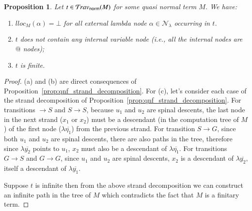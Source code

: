 \documentclass{elsarticle}
\makeatletter
\theoremstyle{plain}
\newtheorem{proposition}[theorem]{Proposition}
\theoremstyle{definition}
\theoremstyle{remark}
\newcommand\Nodes{\mathcal{N}}%
\newcommand\NodesLmd{\Nodes_\lambda}%
\newcommand{\normalizing}{{\sf norm}}
\newcommand{\travsetnorm}{\travset_\normalizing}
\renewcommand\ie{{\it i.e.\@\xspace}}
\makeatother
\begin{document}
\begin{proposition}
\label{prop:qnf_traversals_are_finite}
Let $t \in \travsetnorm(M)$ for some \emph{quasi normal} term $M$. We have:
\begin{enumerate}[label=(\alph*), nosep]
\item $lloc_M(\alpha) = \bot$ for all external lambda node $\alpha \in \NodesLmd$ occurring in $t$.
\item $t$ does not contain any internal variable node (\ie, all the internal nodes are $@$ nodes);
\item $t$ is finite.
\end{enumerate}
\end{proposition}
\begin{proof}
(a) and (b) are direct consequences of Proposition~\ref{prop:qnf_strand_decomposition}.
For (c), let's consider each case of the strand decomposition of Proposition~\ref{prop:qnf_strand_decomposition}. For transitions $\rightarrow S$ and $S \rightarrow S$, because $u_1$ and $u_2$ are spinal descents, the last node in the next strand ($x_1$ or $x_2$) must be a descendant (in the computation tree of $M$) of the first node ($\lambda\overline{\eta_1}$) from the previous strand.
For transition $S\rightarrow G$, since both $u_1$ and $u_2$ are spinal descents, there are also paths in the tree, therefore since $\lambda\overline{y_2}$ points to $u_1$, $x_2$ must also be a descendant of $\lambda\overline{\eta_1}$. For transitions $G \rightarrow S$ and $G \rightarrow G$, since $u_1$ and $u_2$ are spinal descents, $x_2$ is a descendant of $\lambda\overline{y_2}$, itself a descendant of $\lambda\overline{y_1}$.

Suppose $t$ is infinite then from the above strand decomposition we can construct an infinite path in the tree of $M$ which contradicts the fact that $M$ is a finitary term.
\end{proof}
\end{document}
